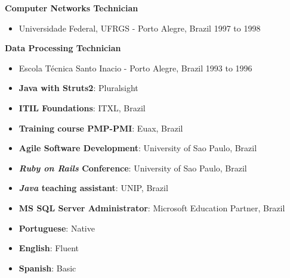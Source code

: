 \documentclass[margin,a4paper]{res}
\def\tightlist{}
\begin{document}
{\textbf{Computer Networks Technician}

\begin{itemize}
\tightlist
\item
  Universidade Federal, UFRGS - Porto Alegre, Brazil \hfill 1997 to 1998
\end{itemize}

\textbf{Data Processing Technician}

\begin{itemize}
\tightlist
\item
  Escola Técnica Santo Inacio - Porto Alegre, Brazil \hfill 1993 to 1996
\end{itemize}

\begin{itemize}
  \hypertarget{additional-training}{%
  \section{Additional Training}\label{additional-training}}
  \tightlist
\item
  \textbf{Java with Struts2}: Pluralsight
\item
  \textbf{ITIL Foundations}: ITXL, Brazil
\item
  \textbf{Training course PMP-PMI}: Euax, Brazil
\item
  \textbf{Agile Software Development}: University of Sao Paulo, Brazil
\item
  \textbf{\emph{Ruby on Rails} Conference}: University of Sao Paulo,
  Brazil
\item
  \textbf{\emph{Java} teaching assistant}: UNIP, Brazil
\item
  \textbf{MS SQL Server Administrator}: Microsoft Education Partner,
  Brazil
\end{itemize}

\begin{itemize}
  \hypertarget{languages}{%
  \section{Languages}\label{languages}}
  \tightlist
\item
  \textbf{Portuguese}: Native
\item
  \textbf{English}: Fluent
\item
  \textbf{Spanish}: Basic
\end{itemize}

\begin{itemize}
  \hypertarget{volunteering}{%
}
\end{itemize}}
\end{document}
